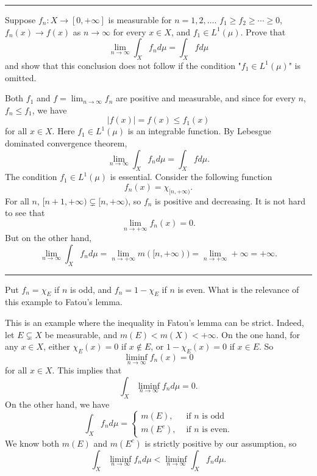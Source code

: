 \documentclass[letterpaper, 12pt]{article}
\begin{document}
\noindent\rule{7in}{2.8pt}
\begin{problem}{1.7}
Suppose \(f_n:X\rightarrow [0,+\infty]\) is measurable for \(n=1,2,\ldots\). \(f_1\geq f_2\geq \cdots \geq 0\), \(f_n(x)\to f(x)\) as \(n\to \infty\) for every \(x\in X\), and \(f_1\in L^1(\mu)\). Prove that 
\[\lim_{n\to \infty}\int_X f_n d\mu=\int_X f d\mu\]
and show that this conclusion does not follow if the condition "\(f_1\in L^1(\mu)\)" is omitted.
\end{problem}
\begin{solution}
Both \(f_1\) and \(f=\lim_{n\to \infty}f_n\) are positive and measurable, and since for every \(n\), \(f_n\leq f_1\), we have 
\[|f(x)|=f(x)\leq f_1(x)\]
for all \(x\in X\). Here \(f_1\in L^1(\mu)\) is an integrable function. By Lebesgue dominated convergence theorem, 
\[\lim_{n\to \infty}\int_X f_n d\mu=\int_X fd\mu.\]
The condition \(f_1\in L^1(\mu)\) is essential. Consider the following function 
\[f_n(x)=\chi_{[n,+\infty)}.\]
For all \(n\), \([n+1,+\infty)\subsetneq [n,+\infty)\), so \(f_n\) is positive and decreasing. It is not hard to see that 
\[\lim_{n\to +\infty}f_n(x)=0.\]
But on the other hand, 
\[\lim_{n\to \infty}\int_X f_nd\mu=\lim_{n\to +\infty}m([n,+\infty))=\lim_{n\to +\infty}+\infty=+\infty.\]
\end{solution}

\noindent\rule{7in}{2.8pt}
\begin{problem}{1.8}
Put \(f_n=\chi_E\) if \(n\) is odd, and \(f_n=1-\chi_E\) if \(n\) is even. What is the relevance of this example to Fatou's lemma. 
\end{problem}
\begin{solution}
This is an example where the inequality in Fatou's lemma can be strict. Indeed, let \(E\subsetneq X\) be measurable, and \(m(E)<m(X)<+\infty\). On the one hand, for any \(x\in X\), either \(\chi_E(x)=0\) if \(x\notin E\), or \(1-\chi_E(x)=0\) if \(x\in E\). So 
\[\liminf_{n\to \infty}f_n(x)=0\]
for all \(x\in X\). This implies that 
\[\int_X \liminf_{n\to \infty}f_n d\mu=0.\]
On the other hand, we have 
\[\int_X f_n d\mu=\begin{cases}
  m(E), &\text{ if \(n\) is odd}\\[0.7em]
  m(E^c), &\text{ if \(n\) is even}.
\end{cases}\]
We know both \(m(E)\) and \(m(E^c)\) is strictly positive by our assumption, so 
\[\int_X \liminf_{n\to \infty}f_n d \mu<\liminf_{n\to \infty}\int_X f_n d\mu.\]
\end{solution}
\end{document}
